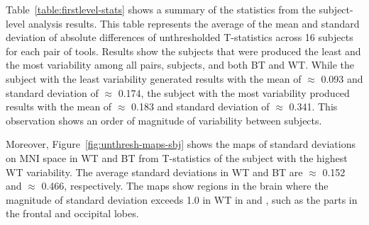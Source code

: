 \documentclass[conference]{IEEEtran}
\begin{document}
  Table~\ref{table:firstlevel-stats} shows a summary of the statistics from the subject-level analysis results.
  This table represents the average of the mean and standard deviation of absolute differences of unthresholded T-statistics
  across 16 subjects for each pair of tools.
  Results show the subjects that were produced the least and the most variability among all pairs, subjects,
  and both BT and WT.
  While the subject with the least variability generated results with the mean of $\approx$ 0.093 and standard deviation of $\approx$ 0.174,
  the subject with the most variability produced results with the mean of $\approx$ 0.183 and standard deviation of $\approx$ 0.341.
  This observation shows an order of magnitude of variability between subjects.

  Moreover, Figure~\ref{fig:unthresh-maps-sbj} shows the maps of standard deviations on MNI space in WT and BT from T-statistics of
  the subject with the highest WT variability.
  The average standard deviations in WT and BT are $\approx$ 0.152 and $\approx$ 0.466, respectively.
  The maps show regions in the brain where the magnitude of standard deviation exceeds 1.0 in WT in \fslafni and \afnispm,
  such as the parts in the frontal and occipital lobes.
\end{document}
